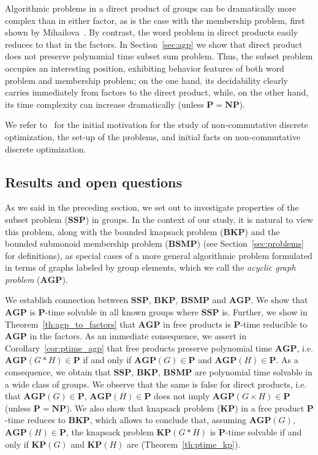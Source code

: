 \documentclass[10pt]{amsart}
\theoremstyle{definition}
\def\P{{\mathbf{P}}}
\def\NP{{\mathbf{NP}}}
\def\SSP{{\mathbf{SSP}}}
\def\BSMP{{\mathbf{BSMP}}}
\def\BKP{{\mathbf{BKP}}}
\def\KP{{\mathbf{KP}}}
\def\AGP{{\mathbf{AGP}}}
\begin{document}
Algorithmic problems in a direct product of groups can be dramatically more complex than in either factor, as is the case with the membership problem, first shown by Mihailova~\cite{Mihailova}. By contrast, the word problem in direct products easily reduces to that in the factors.
In Section~\ref{sec:agp} we show that direct product does not preserve polynomial time subset sum problem. Thus, the subset problem occupies an interesting position, exhibiting behavior features of both word problem and membership problem; on the one hand, its decidability clearly carries immediately from factors to the direct product, while, on the other hand, its time complexity can increase dramatically (unless $\P=\NP$). %


We refer to~\cite{MNU1,MNU2} for the initial motivation for the study of non-commutative discrete optimization, the set-up of the problems, and initial facts on non-commutative discrete optimization.

\subsection{Results and open questions}\label{sub:results}
As we said in the preceding section, we set out to investigate properties of the subset problem ($\SSP$) in groups. In the context of our study, it is natural to view this problem, along with the bounded knapsack problem ($\BKP$) and the bounded submonoid membership problem ($\BSMP$) (see Section~\ref{sec:problems} for definitions), as special cases of a more general algorithmic problem formulated in terms of graphs labeled by group elements, which we call the {\em acyclic graph problem} ($\AGP$).

We establish connection between $\SSP$, $\BKP$, $\BSMP$ and $\AGP$. We show that $\AGP$ is $\P$-time solvable in all known groups where $\SSP$ is. Further, we show in Theorem~\ref{th:agp_to_factors} that $\AGP$ in free products is $\P$-time reducible to $\AGP$ in the factors. As an immediate consequence, we assert in Corollary~\ref{cor:ptime_agp} that free products preserve polynomial time $\AGP$, i.e. $\AGP(G* H)\in\P$ if and only if $\AGP(G)\in\P$ and $\AGP(H)\in\P$. As a consequence, we obtain that $\SSP$, $\BKP$, $\BSMP$ are polynomial time solvable in a wide class of groups. We observe that the same is false for direct products, i.e. that $\AGP(G)\in\P$, $\AGP(H)\in\P$ does not imply $\AGP(G\times H)\in\P$ (unless $\P=\NP$). We also show that knapsack problem ($\KP$) in a free product $\P$-time reduces to $\BKP$, which allows to conclude that, assuming $\AGP(G)$, $\AGP(H)\in\P$, the knapsack problem $\KP(G*H)$ is $\P$-time solvable if and only if $\KP(G)$ and $\KP(H)$ are (Theorem~\ref{th:ptime_kp}).
\end{document}
